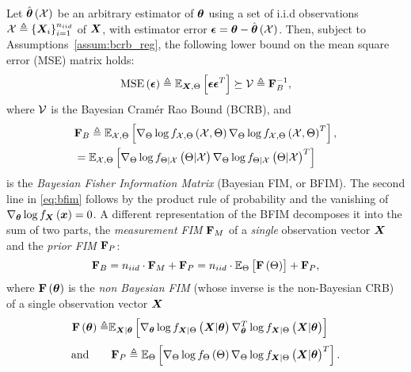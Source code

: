 {Let $\hat{\p}\brackets{{\xset}}$ be an arbitrary estimator of $\p$  using %
{a set of i.i.d observations $\xset\triangleq\set{\X_i}_{i=1}^{\niideval}$ of $\X$}, with estimator error $\e=\p-\hat{\p}\brackets{%
{\xset}}$. Then, subject to Assumptions~\ref{assum:bcrb_reg},}
the following lower bound on the mean square error (MSE) matrix holds\cite{van2007bayesian}:
\begin{equation}\label{eq:bcrb}
\mathrm{MSE}\brackets{\e}\triangleq\expectation{\e\e^T}{\X,\pr}\succeq\bcrb\triangleq \fb^{-1},
\end{equation}
where $\bcrb$ is the Bayesian Cram\'er Rao Bound  (BCRB), and
\begin{align}\label{eq:bfim} &\fb\triangleq\expectation{\nabla_{\pr}\log\probt{\xset,\pr}{\xset,\pr}\nabla_{\pr}\log\probt{\xset,\pr}{\xset,\pr}^T}{\xset,\pr},\nonumber\\
        &=\expectation{\nabla_{\pr}\log\probt{\pr|\xset}{\pr|\xset}\nabla_{\pr}\log\probt{\pr|\xset}{\pr|\xset}^T}{\xset,\pr}
\end{align}
is the \emph{Bayesian Fisher Information Matrix} {(Bayesian FIM, or BFIM).}
{The second line} in \eqref{eq:bfim} {follows by the} product rule of probability and 
{the vanishing of} $\nabla_{\p}\log\probt{\x}{\X}=0$.
A different representation of the BFIM decomposes   it \cite{van2007bayesian} into the sum of two parts, the \emph{{measurement} {FIM}} {$\fm$} %
{of a \emph{single} observation vector $\X$} and the \emph{prior {FIM}} {$\fp$}:
\begin{equation}\label{eq:bfim_decomposition_base}
\fb=\niideval\cdot\fm+\fp=\niideval\cdot\expectation{\F\brackets{\pr}}{\pr}+\fp,
\end{equation}
where $\F\brackets{\p}$ is the \emph{non Bayesian {FIM}} {(whose inverse is the non-Bayesian CRB)} %
{of a single observation vector $\X$} 
\begin{align} \label{eq:non-BayesFim}
\F\brackets{\p}\triangleq&\expectation{\nabla_{\p}\log\probt{\X|\p}{\X|\pr}\nabla^T_{\p}\log\probt{\X|\p}{\X|\pr}}{\X|\p}
\end{align}
\begin{equation} \label{eq:PriorFim}
 \text{and} \qquad  \fp\triangleq\expectation{\nabla_{\pr}\log\probt{\pr}{\pr}\nabla_{\pr}\log\probt{\X|\p}{\X|\pr}^T}{\pr} .
\end{equation}

